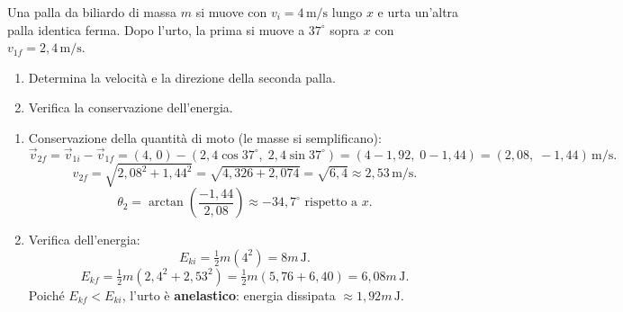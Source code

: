 \begin{question}[ID=4.4, subtitle={Velocità e direzione della seconda palla dopo urto a 37°}, tags={urti nel piano, coordinate, decomposizione vettoriale}, difficulty=difficile]
Una palla da biliardo di massa \(m\) si muove con \(v_i = 4 \, \text{m/s}\) lungo \(x\) e urta un'altra palla identica ferma. Dopo l'urto, la prima si muove a \(37^\circ\) sopra \(x\) con \(v_{1f} = 2{,}4 \, \text{m/s}\).
\begin{enumerate}
    \item Determina la velocità e la direzione della seconda palla.
    \item Verifica la conservazione dell'energia.
\end{enumerate}
\begin{solution}
    \begin{enumerate}
        \item Conservazione della quantità di moto (le masse si semplificano):
        \[
            \vec{v}_{2f} = \vec{v}_{1i} - \vec{v}_{1f}
            = (4,\,0) - (2{,}4\cos37^\circ,\;2{,}4\sin37^\circ)
            = (4 - 1{,}92,\;0 - 1{,}44)
            = (2{,}08,\;-1{,}44) \, \text{m/s}.
        \]
        \[
            v_{2f} = \sqrt{2{,}08^2 + 1{,}44^2} = \sqrt{4{,}326 + 2{,}074} = \sqrt{6{,}4} \approx 2{,}53 \, \text{m/s}.
        \]
        \[
            \theta_2 = \arctan\!\left(\frac{-1{,}44}{2{,}08}\right) \approx -34{,}7^\circ \text{ rispetto a } x.
        \]
        \item Verifica dell'energia:
        \[
            E_{ki} = \tfrac{1}{2}m(4^2) = 8m \, \text{J}.
        \]
        \[
            E_{kf} = \tfrac{1}{2}m(2{,}4^2 + 2{,}53^2) = \tfrac{1}{2}m(5{,}76 + 6{,}40) = 6{,}08m \, \text{J}.
        \]
        Poiché \(E_{kf} < E_{ki}\), l'urto è \textbf{anelastico}: energia dissipata \(\approx 1{,}92m \, \text{J}\).
    \end{enumerate}
\end{solution}
\end{question}


